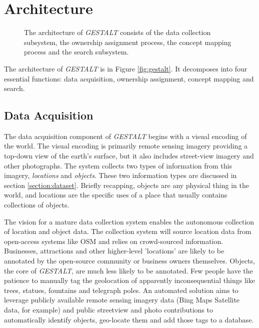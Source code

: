 \section{Architecture}
\label{section:architecture}

\begin{figure*}[t]
	\label{fig:architecture}
	
	\centering
	\caption[widht=\textwidth]{The architecture of \textit{GESTALT} consists of the data collection subsystem, the ownership assignment process, the concept mapping process and the search subsystem.}
\end{figure*}

The architecture of \textit{GESTALT} is in Figure \ref{fig:gestalt}. It decomposes into four essential functions: data acquisition, ownership assignment, concept mapping and search. 

\subsection{Data Acquisition}
The data acquisition component of \textit{GESTALT} begins with a visual encoding of the world. 
The visual encoding is primarily remote sensing imagery providing a top-down view of the earth's surface, but it also includes street-view imagery and other photographs. 
The system collects two types of information from this imagery, \textit{locations} and \textit{objects}. 
These two information types are discussed in section \ref{section:dataset}. 
Briefly recapping, objects are any physical thing in the world, and locations are the specific uses of a place that usually contains collections of objects. 

The vision for a mature data collection system enables the autonomous collection of location and object data. 
The collection system will source location data from open-access systems like OSM and relies on crowd-sourced information. 
Businesses, attractions and other higher-level 'locations' are likely to be annotated by the open-source community or business owners themselves. 
Objects, the core of \textit{GESTALT}, are much less likely to be annotated. Few people have the patience to manually tag the geolocation of apparently inconsequential things like trees, statues, fountains and telegraph poles. 
An automated solution aims to leverage publicly available remote sensing imagery data (Bing Maps Satellite data, for example) and public streetview and photo contributions to automatically identify objects, geo-locate them and add those tags to a database. 

